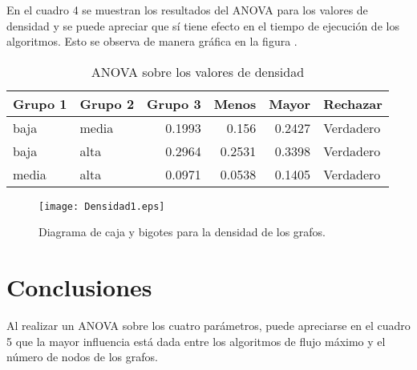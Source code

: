 \documentclass{article}
\begin{document}
En el cuadro 4 se muestran los resultados del ANOVA para los valores de densidad y se puede apreciar que sí tiene efecto en el tiempo de ejecución de los algoritmos. Esto se observa de manera gráfica en la figura \pageref{Figura 6}.

\begin{table}[htbp]
  \centering
  \caption{ANOVA sobre los valores de densidad}
    \begin{tabular}{|l|l|r|r|r|l|}
    \toprule
    \rowcolor[rgb]{ .357,  .608,  .835} \textbf{Grupo 1} & \textbf{Grupo 2} & \multicolumn{1}{l|}{\textbf{Grupo 3}} & \multicolumn{1}{l|}{\textbf{Menos}} & \multicolumn{1}{l|}{\textbf{Mayor}} & \textbf{Rechazar} \\
    \midrule
    baja  & media & 0.1993 & 0.156 & 0.2427 & Verdadero \\
    \midrule
    baja  & alta  & 0.2964 & 0.2531 & 0.3398 & Verdadero \\
    \midrule
    media & alta  & 0.0971 & 0.0538 & 0.1405 & Verdadero \\
    \bottomrule
    \end{tabular}%
  \label{tab:Cuadro 4}%
\end{table}%

\begin{figure}
\begin{center}
  \texttt{[image: Densidad1.eps]}
\end{center}
\vspace*{-8mm}
\caption{Diagrama de caja y bigotes para la densidad de los grafos.}
  \label{Figura 6} 
\end{figure}

\section*{Conclusiones}

Al realizar un ANOVA sobre los cuatro parámetros, puede apreciarse en el cuadro 5 que la mayor influencia está dada entre los algoritmos de flujo máximo y el número de nodos de los grafos.
\end{document}
